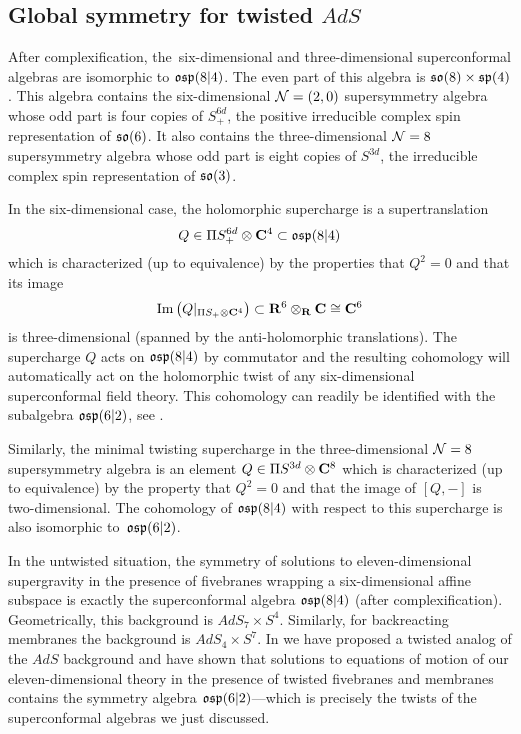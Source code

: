 \subsection{Global symmetry for twisted $AdS$}
\label{s:global1}

After complexification, the~six-dimensional and three-dimensional superconformal algebras are isomorphic to $\mathfrak{osp}(8|4)$.
The even part of this algebra is $\mathfrak{so}(8) \times \mathfrak{sp}(4)$.
This algebra contains the six-dimensional $\mathcal N=(2,0)$ supersymmetry algebra whose odd part is four copies of $S^{6d}_+$, the positive irreducible complex spin representation of $\mathfrak{so}(6)$.
It also contains the three-dimensional $\mathcal N=8$ supersymmetry algebra whose odd part is eight copies of $S^{3d}$, the irreducible complex spin representation of $\mathfrak{so}(3)$. 

In the six-dimensional case, the holomorphic supercharge is a supertranslation 
\[
Q \in \Pi S^{6d}_+ \otimes \mathbf{C}^4 \subset \mathfrak{osp}(8|4)
\]
which is characterized (up to equivalence) by the properties that $Q^2 = 0$ and that its image
\[
{\rm Im}\left(Q|_{\Pi S_+ \otimes \mathbf{C}^4} \right) \subset \mathbf{R}^6 \otimes_{\mathbf{R}} \mathbf{C} \cong \mathbf{C}^6
\]
is three-dimensional (spanned by the anti-holomorphic translations). 
The supercharge $Q$ acts on $\mathfrak{osp}(8|4)$ by commutator and the resulting cohomology will automatically act on the holomorphic twist of any six-dimensional superconformal field theory. 
This cohomology can readily be identified with the subalgebra $\mathfrak{osp}(6|2)$, see \cite{SWe36}. 

Similarly, the minimal twisting supercharge in the three-dimensional $\mathcal N=8$ supersymmetry algebra is an element $Q \in \Pi S^{3d} \otimes \mathbf{C}^8$ which is characterized (up to equivalence) by the property that $Q^2 = 0$ and that the image of $[Q,-]$ is two-dimensional. 
The cohomology of $\mathfrak{osp}(8|4)$ with respect to this supercharge is also isomorphic to~$\mathfrak{osp}(6|2)$. 

In the untwisted situation, the symmetry of solutions to eleven-dimensional supergravity in the presence of fivebranes wrapping a six-dimensional affine subspace is exactly the superconformal algebra $\mathfrak{osp}(8|4)$ (after complexification). 
Geometrically, this background is $AdS_7 \times S^4$. 
Similarly, for backreacting membranes the background is $AdS_4 \times S^7$. 
In \cite{RSW} we have proposed a twisted analog of the $AdS$ background and have shown that solutions to equations of motion of our eleven-dimensional theory in the presence of twisted fivebranes and membranes contains the symmetry algebra $\mathfrak{osp}(6|2)$---which is precisely the twists of the superconformal algebras we just discussed.

